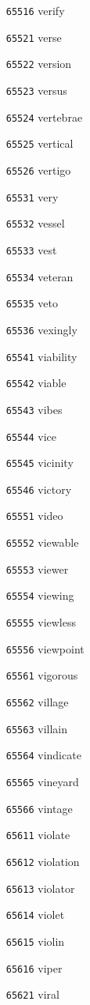 \documentclass[twoside,11pt]{article}
\begin{document}
\begin{multicols}{5}
\begin{enumerate}
\item[\texttt{65516}] verify
\item[\texttt{65521}] verse
\item[\texttt{65522}] version
\item[\texttt{65523}] versus
\item[\texttt{65524}] vertebrae
\item[\texttt{65525}] vertical
\item[\texttt{65526}] vertigo
\item[\texttt{65531}] very
\item[\texttt{65532}] vessel
\item[\texttt{65533}] vest
\item[\texttt{65534}] veteran
\item[\texttt{65535}] veto
\item[\texttt{65536}] vexingly
\item[\texttt{65541}] viability
\item[\texttt{65542}] viable
\item[\texttt{65543}] vibes
\item[\texttt{65544}] vice
\item[\texttt{65545}] vicinity
\item[\texttt{65546}] victory
\item[\texttt{65551}] video
\item[\texttt{65552}] viewable
\item[\texttt{65553}] viewer
\item[\texttt{65554}] viewing
\item[\texttt{65555}] viewless
\item[\texttt{65556}] viewpoint
\item[\texttt{65561}] vigorous
\item[\texttt{65562}] village
\item[\texttt{65563}] villain
\item[\texttt{65564}] vindicate
\item[\texttt{65565}] vineyard
\item[\texttt{65566}] vintage
\item[\texttt{65611}] violate
\item[\texttt{65612}] violation
\item[\texttt{65613}] violator
\item[\texttt{65614}] violet
\item[\texttt{65615}] violin
\item[\texttt{65616}] viper
\item[\texttt{65621}] viral

\end{enumerate}
\end{multicols}
\end{document}
